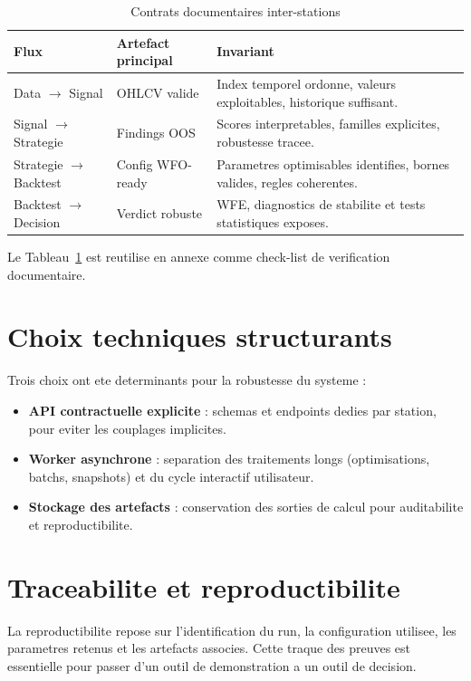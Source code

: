 \begin{table}[H]
\centering
\caption{Contrats documentaires inter-stations}
\label{tab:contrats-interstations}
\begin{tabular}{p{3.2cm}p{4cm}p{7.2cm}}
\toprule
\textbf{Flux} & \textbf{Artefact principal} & \textbf{Invariant} \\
\midrule
Data $\rightarrow$ Signal & OHLCV valide & Index temporel ordonne, valeurs exploitables, historique suffisant. \\
Signal $\rightarrow$ Strategie & Findings OOS & Scores interpretables, familles explicites, robustesse tracee. \\
Strategie $\rightarrow$ Backtest & Config WFO-ready & Parametres optimisables identifies, bornes valides, regles coherentes. \\
Backtest $\rightarrow$ Decision & Verdict robuste & WFE, diagnostics de stabilite et tests statistiques exposes. \\
\bottomrule
\end{tabular}
\end{table}

Le Tableau~\ref{tab:contrats-interstations} est reutilise en annexe comme check-list
de verification documentaire.

\section{Choix techniques structurants}
Trois choix ont ete determinants pour la robustesse du systeme :
\begin{itemize}
\item \textbf{API contractuelle explicite} : schemas et endpoints dedies par
station, pour eviter les couplages implicites.
\item \textbf{Worker asynchrone} : separation des traitements longs
(optimisations, batchs, snapshots) et du cycle interactif utilisateur.
\item \textbf{Stockage des artefacts} : conservation des sorties de calcul
pour auditabilite et reproductibilite.
\end{itemize}

\section{Traceabilite et reproductibilite}
La reproductibilite repose sur l'identification du run, la configuration
utilisee, les parametres retenus et les artefacts associes. Cette traque des
preuves est essentielle pour passer d'un outil de demonstration a un outil de
decision.
